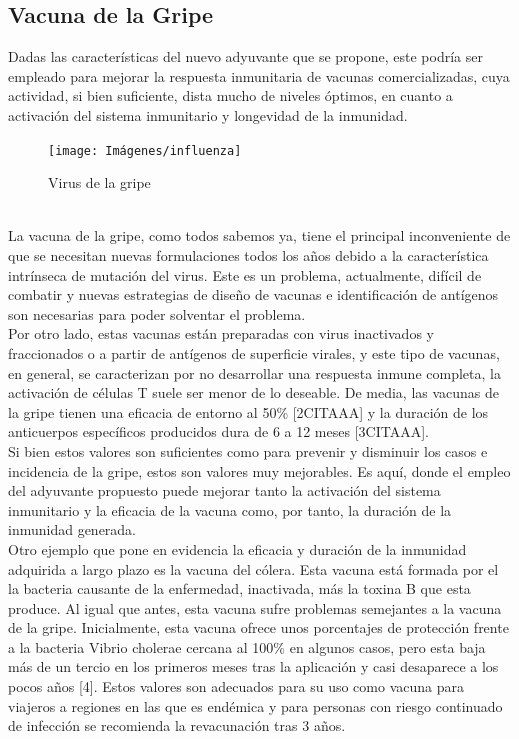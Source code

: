 \documentclass[a4paper,11pt]{article}
\begin{document}
\subsection{Vacuna de la Gripe}
Dadas las características del nuevo adyuvante que se propone, este podría ser empleado para mejorar la respuesta inmunitaria de vacunas comercializadas, cuya actividad, si bien suficiente, dista mucho de niveles óptimos, en cuanto a activación del sistema inmunitario y longevidad de la inmunidad.
\begin{figure}[h]
	\centering
	\texttt{[image: Imágenes/influenza]}
	\caption{Virus de la gripe}

\end{figure}
\\La vacuna de la gripe, como todos sabemos ya, tiene el principal inconveniente de que se necesitan nuevas formulaciones todos los años debido a la característica intrínseca de mutación del virus. Este es un problema, actualmente, difícil de combatir y nuevas estrategias de diseño de vacunas e identificación de antígenos son necesarias para poder solventar el problema.
\\Por otro lado, estas vacunas están preparadas con virus inactivados y fraccionados o a partir de antígenos de superficie virales, y este tipo de vacunas, en general, se caracterizan por no desarrollar una respuesta inmune completa, la activación de células T suele ser menor de lo deseable. De media, las vacunas de la gripe tienen una eficacia de entorno al 50\% [2CITAAA] y la duración de los anticuerpos específicos producidos dura de 6 a 12 meses [3CITAAA].
\\Si bien estos valores son suficientes como para prevenir y disminuir los casos e incidencia de la gripe, estos son valores muy mejorables. Es aquí, donde el empleo del adyuvante propuesto puede mejorar tanto la activación del sistema inmunitario y la eficacia de la vacuna como, por tanto, la duración de la inmunidad generada.
\\Otro ejemplo que pone en evidencia la eficacia y duración de la inmunidad adquirida a largo plazo es la vacuna del cólera. Esta vacuna está formada por el la bacteria causante de la enfermedad, inactivada, más la toxina B que esta produce. Al igual que antes, esta vacuna sufre problemas semejantes a la vacuna de la gripe. Inicialmente, esta vacuna ofrece unos porcentajes de protección frente a la bacteria Vibrio cholerae cercana al 100\% en algunos casos, pero esta baja más de un tercio en los primeros meses tras la aplicación y casi desaparece a los pocos años [4]. Estos valores son adecuados para su uso como vacuna para viajeros a regiones en las que es endémica y para personas con riesgo continuado de infección se recomienda la revacunación tras 3 años.
\end{document}
